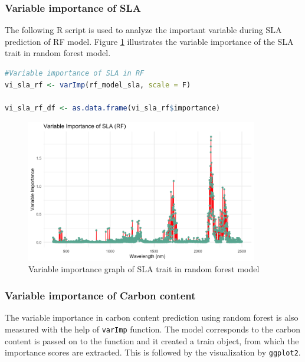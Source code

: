 \documentclass[12pt,a4paper]{report}
\begin{document}
\subsubsection*{Variable importance of SLA}
The following R script is used to analyze the important variable during SLA prediction of RF model. Figure \ref{fig:vi_sla_rf} illustrates the variable importance of the SLA trait in random forest model. \\

\begin{lstlisting}[language=R, style=mystyle]
#Variable importance of SLA in RF
vi_sla_rf <- varImp(rf_model_sla, scale = F)

vi_sla_rf_df <- as.data.frame(vi_sla_rf$importance)
\end{lstlisting}

\begin{figure}[h]
    \centering
    \includegraphics[width=0.9\textwidth]{Figures/vi_sla_rf.png}
    \caption{Variable importance graph of SLA trait in random forest model}
    \label{fig:vi_sla_rf}
\end{figure}

\subsubsection*{Variable importance of Carbon content}
The variable importance in carbon content prediction using random forest is also measured with the help of \texttt{varImp} function. The model corresponds to the carbon content is passed on to the function and it created a train object, from which the importance scores are extracted. This is followed by the visualization by \texttt{ggplot2}.\\
\end{document}
